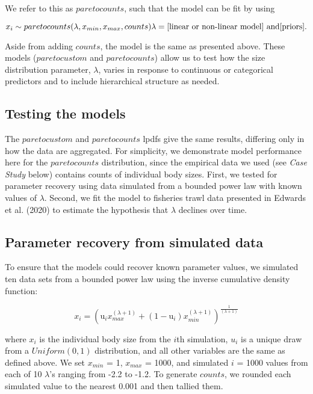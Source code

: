 \documentclass[
  12pt,
]{article}
\begin{document}
We refer to this as \(paretocounts\), such that the model can be fit by
using

\begin{equation}x_i\sim paretocounts(\lambda, x_{min}, x_{max}, counts)$$ $$\lambda = [\text{linear or non-linear model}] \text{ and}$$ $$\text{[priors]}.\end{equation}

Aside from adding \(counts\), the model is the same as presented above.
These models (\(paretocustom\) and \(paretocounts\)) allow us to test
how the size distribution parameter, \(\lambda\), varies in response to
continuous or categorical predictors and to include hierarchical
structure as needed.

\hypertarget{testing-the-models}{%
\subsection{Testing the models}\label{testing-the-models}}

The \(paretocustom\) and \(paretocounts\) lpdfs give the same results,
differing only in how the data are aggregated. For simplicity, we
demonstrate model performance here for the \(paretocounts\)
distribution, since the empirical data we used (see \emph{Case Study}
below) contains counts of individual body sizes. First, we tested for
parameter recovery using data simulated from a bounded power law with
known values of \(\lambda\). Second, we fit the model to fisheries trawl
data presented in Edwards et al. (2020) to estimate the hypothesis that
\(\lambda\) declines over time.

\hypertarget{parameter-recovery-from-simulated-data}{%
\subsection{Parameter recovery from simulated
data}\label{parameter-recovery-from-simulated-data}}

To ensure that the models could recover known parameter values, we
simulated ten data sets from a bounded power law using the inverse
cumulative density function:

\begin{equation}
x_i = (\text{u}_ix_{max}^{(\lambda+1)} +  (1-\text{u}_i)  x_{min}^{(\lambda+1)} ) ^ {\frac{1}{(\lambda+1)}}
\end{equation}

where \(x_i\) is the individual body size from the \(i\)th simulation,
\(u_i\) is a unique draw from a \(Uniform(0,1)\) distribution, and all
other variables are the same as defined above. We set \(x_{min}\) = 1,
\(x_{max}\) = 1000, and simulated \(i\) = 1000 values from each of 10
\(\lambda\)'s ranging from -2.2 to -1.2. To generate \(counts\), we
rounded each simulated value to the nearest 0.001 and then tallied them.
\end{document}
